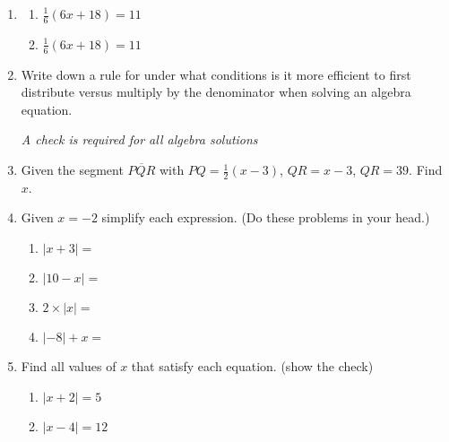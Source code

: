 \begin{enumerate}
\item 
  \begin{multicols}{2}
    \begin{enumerate}
      \item $\frac{1}{6}(6x+18)=11$
      \item $\frac{1}{6}(6x+18)=11$
    \end{enumerate}
  \end{multicols} \vspace{3cm}

\item Write down a rule for under what conditions is it more efficient to first distribute versus multiply by the denominator when solving an algebra equation.

\newpage
\emph{A check is required for all algebra solutions}
\item Given the segment $\overline{PQR}$ with $PQ=\frac{1}{2}(x-3)$, $QR=x-3$, $QR=39$. Find $x$. \medskip
\begin{flushleft}
\end{flushleft} \vspace{6cm}

\item Given $x=-2$ simplify each expression. (Do these problems in your head.)
  \begin{multicols}{2}
    \begin{enumerate}[itemsep=1cm]
      \item $|x+3|=$
      \item $|10-x|=$
      \item $2 \times |x|=$
      \item $|-8|+x=$
    \end{enumerate}
  \end{multicols} \bigskip

\item Find all values of $x$ that satisfy each equation. (show the check) \bigskip
  \begin{multicols}{2} 
    \begin{enumerate}
      \item $|x+2|=5$
      \item $|x-4|=12$
    \end{enumerate}
  \end{multicols}


\end{enumerate}
